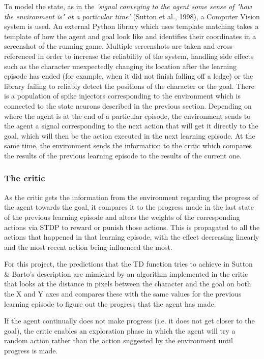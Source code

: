 \documentclass[10pt]{article}
\begin{document}
    To model the state, as in the \textit{'signal conveying to the agent some sense of "how the environment is" at a particular time'} (Sutton et al., 1998), a Computer Vision system is used. An external Python library which uses template matching takes a template of how the agent and goal look like and identifies their coordinates in a screenshot of the running game. Multiple screenshots are taken and cross-referenced in order to increase the reliability of the system, handling side effects such as the character unexpectedly changing its location after the learning episode has ended (for example, when it did not finish falling off a ledge) or the library failing to reliably detect the positions of the character or the goal. There is a population of spike injectors corresponding to the environment which is connected to the state neurons described in the previous section. Depending on where the agent is at the end of a particular episode, the environment sends to the agent a signal corresponding to the next action that will get it directly to the goal, which will then be the action executed in the next learning episode. At the same time, the environment sends the information to the critic which compares the results of the previous learning episode to the results of the current one.

    \subsubsection{The critic}

    As the critic gets the information from the environment regarding the progress of the agent towards the goal, it compares it to the progress made in the last state of the previous learning episode and alters the weights of the corresponding actions via STDP to reward or punish those actions. This is propagated to all the actions that happened in that learning episode, with the effect decreasing linearly and the most recent action being influenced the most.

    For this project, the predictions that the TD function tries to achieve in Sutton \& Barto's description are mimicked by an algorithm implemented in the critic that looks at the distance in pixels between the character and the goal on both the X and Y axes and compares these with the same values for the previous learning episode to figure out the progress that the agent has made.

    If the agent continually does not make progress (i.e. it does not get closer to the goal), the critic enables an exploration phase in which the agent will try a random action rather than the action suggested by the environment until progress is made.
\end{document}
